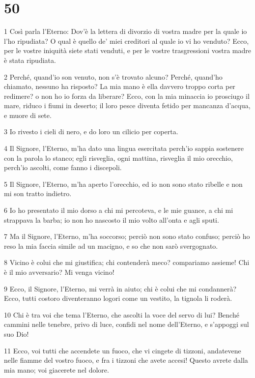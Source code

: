 \chapter{50}

\par 1 Così parla l'Eterno: Dov'è la lettera di divorzio di vostra madre per la quale io l'ho ripudiata? O qual è quello de' miei creditori al quale io vi ho venduto? Ecco, per le vostre iniquità siete stati venduti, e per le vostre trasgressioni vostra madre è stata ripudiata.
\par 2 Perché, quand'io son venuto, non s'è trovato alcuno? Perché, quand'ho chiamato, nessuno ha risposto? La mia mano è ella davvero troppo corta per redimere? o non ho io forza da liberare? Ecco, con la mia minaccia io prosciugo il mare, riduco i fiumi in deserto; il loro pesce diventa fetido per mancanza d'acqua, e muore di sete.
\par 3 Io rivesto i cieli di nero, e do loro un cilicio per coperta.
\par 4 Il Signore, l'Eterno, m'ha dato una lingua esercitata perch'io sappia sostenere con la parola lo stanco; egli risveglia, ogni mattina, risveglia il mio orecchio, perch'io ascolti, come fanno i discepoli.
\par 5 Il Signore, l'Eterno, m'ha aperto l'orecchio, ed io non sono stato ribelle e non mi son tratto indietro.
\par 6 Io ho presentato il mio dorso a chi mi percoteva, e le mie guance, a chi mi strappava la barba; io non ho nascosto il mio volto all'onta e agli sputi.
\par 7 Ma il Signore, l'Eterno, m'ha soccorso; perciò non sono stato confuso; perciò ho reso la mia faccia simile ad un macigno, e so che non sarò svergognato.
\par 8 Vicino è colui che mi giustifica; chi contenderà meco? compariamo assieme! Chi è il mio avversario? Mi venga vicino!
\par 9 Ecco, il Signore, l'Eterno, mi verrà in aiuto; chi è colui che mi condannerà? Ecco, tutti costoro diventeranno logori come un vestito, la tignola li roderà.
\par 10 Chi è tra voi che tema l'Eterno, che ascolti la voce del servo di lui? Benché cammini nelle tenebre, privo di luce, confidi nel nome dell'Eterno, e s'appoggi sul suo Dio!
\par 11 Ecco, voi tutti che accendete un fuoco, che vi cingete di tizzoni, andatevene nelle fiamme del vostro fuoco, e fra i tizzoni che avete accesi! Questo avrete dalla mia mano; voi giacerete nel dolore.


